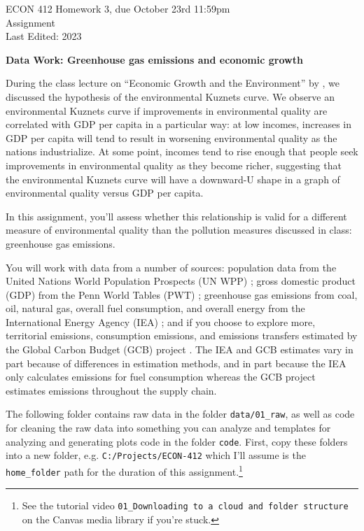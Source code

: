\noindent
\begin{minipage}[t]{.8\textwidth}
\raggedright
	\Large ECON 412 Homework 3, due October 23rd 11:59pm\\
 	\large Assignment \\
 	Last Edited: 2023 %
\end{minipage}%

\noindent

\textbf{\Large{Data Work: Greenhouse gas emissions and economic growth}}

During the class lecture on ``Economic Growth and the Environment'' by \citet{grossmanEconomicGrowthEnvironment1995}, we discussed the hypothesis of the environmental Kuznets curve. We observe an environmental Kuznets curve if improvements in environmental quality are correlated with GDP per capita in a particular way: at low incomes, increases in GDP per capita will tend to result in worsening environmental quality as the nations industrialize. At some point, incomes tend to rise enough that people seek improvements in environmental quality as they become richer, suggesting that the environmental Kuznets curve will have a downward-U shape in a graph of environmental quality versus GDP per capita.

In this assignment, you'll assess whether this relationship is valid for a different measure of environmental quality than the pollution measures discussed in class: greenhouse gas emissions.

You will work with data from a number of sources: population data from the United Nations World Population Prospects (UN WPP) \citep{undesaWorldPopulationProspects2022}; gross domestic product (GDP) from the Penn World Tables (PWT) \citep{feenstraNextGenerationPenn2015}; greenhouse gas emissions from coal, oil, natural gas, overall fuel consumption, and overall energy  from the International Energy Agency (IEA) \citep{ieaGreenhouseGasEmissions2023}; and if you choose to explore more, territorial emissions, consumption emissions, and emissions transfers estimated by the Global Carbon Budget (GCB) project \citep{petersSynthesisCarbonInternational2012,friedlingsteinGlobalCarbonBudget2022}. The IEA and GCB estimates vary in part because of differences in estimation methods, and in part because the IEA only calculates emissions for fuel consumption whereas the GCB project estimates emissions throughout the supply chain. 

The following folder contains raw data in the folder \verb+data/01_raw+, as well as code for cleaning the raw data into something you can analyze and templates for analyzing and generating plots code in the folder \verb+code+. First, copy these folders into a new folder, e.g. \verb+C:/Projects/ECON-412+ which I'll assume is the \verb+home_folder+ path for the duration of this assignment.\footnote{See the tutorial video \texttt{01\_Downloading to a cloud and folder structure} on the Canvas media library if you're stuck.} 

